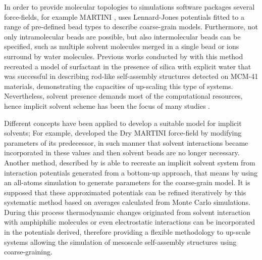 \documentclass[10pt,a4paper,twoside]{article}
\begin{document}
In order to provide molecular topologies to simulations software packages several force-fields, for example MARTINI \cite{martini}, uses Lennard-Jones potentials fitted to a range of pre-defined bead types to describe coarse-grain models. Furthermore, not only intramolecular beads are possible, but also intermolecular beads can be specified, such as multiple solvent molecules merged in a single bead or ions surround by water molecules. Previous works conducted by \cite{mjsilica} with this method recreated a model of surfactant in the presence of silica with explicit water that was successful in describing rod-like self-assembly structures detected on MCM-41 materials, demonstrating the capacities of up-scaling this type of systems. Nevertheless, solvent presence demands most of the computational resources, hence  implicit solvent scheme has been the focus of many studies \cite{gromacs}.

Different concepts have been applied to develop a suitable model for implicit solvents; For example,  developed the Dry MARTINI force-field by modifying parameters of its predecessor, in such manner that solvent interactions became incorporated in these values and then solvent beads are no longer necessary. Another method, described by  is able to recreate an implicit solvent system from interaction potentials generated from a bottom-up approach, that means by using an all-atoms simulation to generate parameters for the coarse-grain model. It is supposed  that these approximated potentials can be refined iteratively by this systematic method based on averages calculated from Monte Carlo simulations. 
During this process thermodynamic changes originated from solvent interaction with amphiphilic molecules or even electrostatic interactions can be incorporated in the potentials derived, therefore providing a flexible methodology to up-scale systems allowing the simulation of mesoscale self-assembly structures using coarse-graining.
\end{document}
